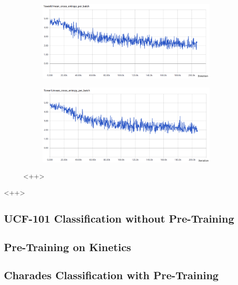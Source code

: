 \begin{figure}[H]
    \begin{subfigure}[c]{\textwidth}
    \centering
    \includegraphics[width=\textwidth]{img_evaluation/tower0crossentropy}
    \end{subfigure}
    \begin{subfigure}[c]{\textwidth}
    \includegraphics[width=\textwidth]{img_evaluation/tower1crossentropy}
    \end{subfigure}<++>
\label{fig:<+label+>}
\end{figure}<++>


\subsection{UCF-101 Classification without Pre-Training}


\subsection{Pre-Training on Kinetics}


\subsection{Charades Classification with Pre-Training}


